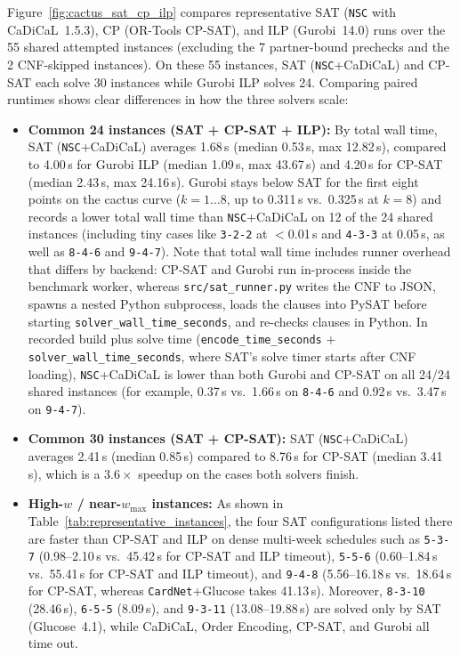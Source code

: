 \documentclass[a4paper,fleqn]{cas-sc}
\begin{document}
Figure~\ref{fig:cactus_sat_cp_ilp} compares representative SAT (\texttt{NSC} with CaDiCaL~1.5.3), CP (OR-Tools CP-SAT), and ILP (Gurobi~14.0) runs over the 55 shared attempted instances (excluding the 7 partner-bound prechecks and the 2 CNF-skipped instances). On these 55 instances, SAT (\texttt{NSC}+CaDiCaL) and CP-SAT each solve 30 instances while Gurobi ILP solves 24. Comparing paired runtimes shows clear differences in how the three solvers scale:
\begin{itemize}[noitemsep]
    \item \textbf{Common 24 instances (SAT + CP-SAT + ILP):} By total wall time, SAT (\texttt{NSC}+CaDiCaL) averages 1.68\,s (median 0.53\,s, max 12.82\,s), compared to 4.00\,s for Gurobi ILP (median 1.09\,s, max 43.67\,s) and 4.20\,s for CP-SAT (median 2.43\,s, max 24.16\,s). Gurobi stays below SAT for the first eight points on the cactus curve ($k=1\ldots 8$, up to 0.311\,s vs.\ 0.325\,s at $k=8$) and records a lower total wall time than \texttt{NSC}+CaDiCaL on 12 of the 24 shared instances (including tiny cases like \texttt{3-2-2} at $<$0.01\,s and \texttt{4-3-3} at 0.05\,s, as well as \texttt{8-4-6} and \texttt{9-4-7}). Note that total wall time includes runner overhead that differs by backend: CP-SAT and Gurobi run in-process inside the benchmark worker, whereas \texttt{src/sat\_runner.py} writes the CNF to JSON, spawns a nested Python subprocess, loads the clauses into PySAT before starting \texttt{solver\_wall\_time\_seconds}, and re-checks clauses in Python. In recorded build plus solve time (\texttt{encode\_time\_seconds} $+$ \texttt{solver\_wall\_time\_seconds}, where SAT's solve timer starts after CNF loading), \texttt{NSC}+CaDiCaL is lower than both Gurobi and CP-SAT on all 24/24 shared instances (for example, 0.37\,s vs.\ 1.66\,s on \texttt{8-4-6} and 0.92\,s vs.\ 3.47\,s on \texttt{9-4-7}).
    \item \textbf{Common 30 instances (SAT + CP-SAT):} SAT (\texttt{NSC}+CaDiCaL) averages 2.41\,s (median 0.85\,s) compared to 8.76\,s for CP-SAT (median 3.41\,s), which is a $3.6\times$ speedup on the cases both solvers finish.
    \item \textbf{High-$w$ / near-$w_{\max}$ instances:} As shown in Table~\ref{tab:representative_instances}, the four SAT configurations listed there are faster than CP-SAT and ILP on dense multi-week schedules such as \texttt{5-3-7} (0.98--2.10\,s vs.\ 45.42\,s for CP-SAT and ILP timeout), \texttt{5-5-6} (0.60--1.84\,s vs.\ 55.41\,s for CP-SAT and ILP timeout), and \texttt{9-4-8} (5.56--16.18\,s vs.\ 18.64\,s for CP-SAT, whereas \texttt{CardNet}+Glucose takes 41.13\,s). Moreover, \texttt{8-3-10} (28.46\,s), \texttt{6-5-5} (8.09\,s), and \texttt{9-3-11} (13.08--19.88\,s) are solved only by SAT (Glucose~4.1), while CaDiCaL, Order Encoding, CP-SAT, and Gurobi all time out.

\end{itemize}
\end{document}
